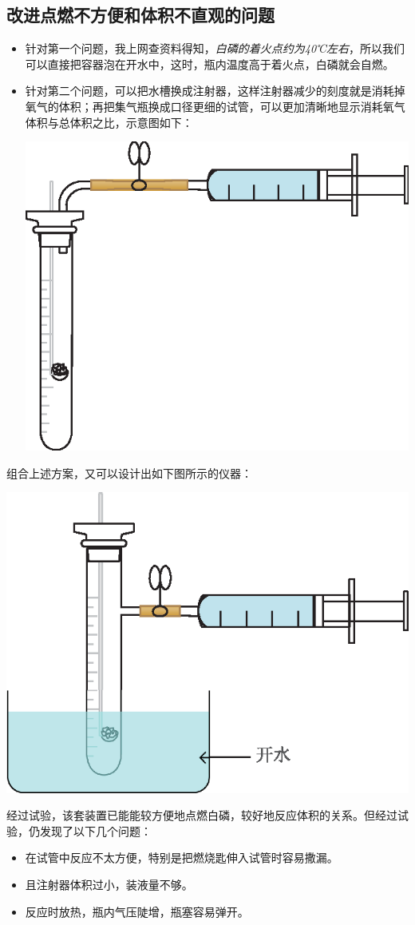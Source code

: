 \documentclass[11pt,a4paper,titlepage]{ctexart}
\begin{document}
	\subsection{改进点燃不方便和体积不直观的问题}
	
	\begin{itemize}
		\item 针对第一个问题，我上网查资料得知，\textit{白磷的着火点约为40℃左右}，所以我们可以直接把容器泡在开水中，这时，瓶内温度高于着火点，白磷就会自燃。
		\item 针对第二个问题，可以把水槽换成注射器，这样注射器减少的刻度就是消耗掉氧气的体积；再把集气瓶换成口径更细的试管，可以更加清晰地显示消耗氧气体积与总体积之比，示意图如下：\\
		\begin{center}
			\includegraphics[width=0.4\linewidth]{fig/4}
		\end{center}
	\end{itemize}
		
	组合上述方案，又可以设计出如下图所示的仪器：
		
	\begin{center}
		\includegraphics[width=0.4\linewidth]{fig/5}
	\end{center}
		
	经过试验，该套装置已能能较方便地点燃白磷，较好地反应体积的关系。但经过试验，仍发现了以下几个问题：
	
	\begin{itemize}
		\item 在试管中反应不太方便，特别是把燃烧匙伸入试管时容易撒漏。
		\item 且注射器体积过小，装液量不够。
		\item 反应时放热，瓶内气压陡增，瓶塞容易弹开。
	\end{itemize}
	
\end{document}
